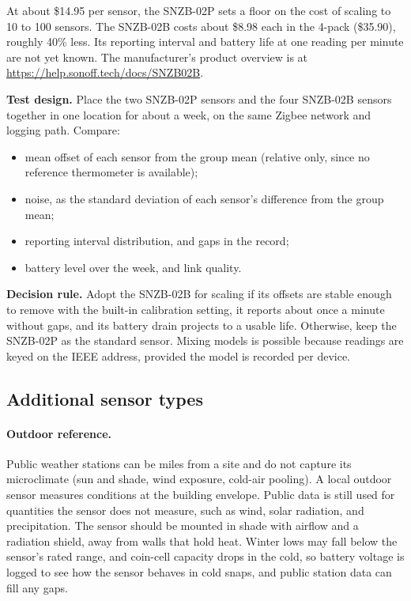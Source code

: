 \documentclass[11pt,letterpaper]{article}
\begin{document}
At about \$14.95 per sensor, the SNZB-02P sets a floor on the cost of scaling to
10 to 100 sensors. The SNZB-02B costs about \$8.98 each in the 4-pack
(\$35.90), roughly 40\% less. Its reporting interval and battery life at one
reading per minute are not yet known. The manufacturer's product overview is at
\url{https://help.sonoff.tech/docs/SNZB02B}.

\textbf{Test design.} Place the two SNZB-02P sensors and the four SNZB-02B
sensors together in one location for about a week, on the same Zigbee network
and logging path. Compare:
\begin{itemize}
  \item mean offset of each sensor from the group mean (relative only, since no
    reference thermometer is available);
  \item noise, as the standard deviation of each sensor's difference from the
    group mean;
  \item reporting interval distribution, and gaps in the record;
  \item battery level over the week, and link quality.
\end{itemize}

\textbf{Decision rule.} Adopt the SNZB-02B for scaling if its offsets are stable
enough to remove with the built-in calibration setting, it reports about once a
minute without gaps, and its battery drain projects to a usable life.
Otherwise, keep the SNZB-02P as the standard sensor. Mixing models is possible
because readings are keyed on the IEEE address, provided the model is recorded
per device.

\subsection{Additional sensor types}

\paragraph{Outdoor reference.} Public weather stations can be miles from a
site and do not capture its microclimate (sun and shade, wind exposure,
cold-air pooling). A local outdoor sensor measures conditions at the building
envelope. Public data is still used for quantities the sensor does not measure,
such as wind, solar radiation, and precipitation. The sensor should be mounted
in shade with airflow and a radiation shield, away from walls that hold heat. Winter lows may
fall below the sensor's rated range, and coin-cell capacity drops in the cold,
so battery voltage is logged to see how the sensor behaves in cold snaps, and
public station data can fill any gaps.
\end{document}
